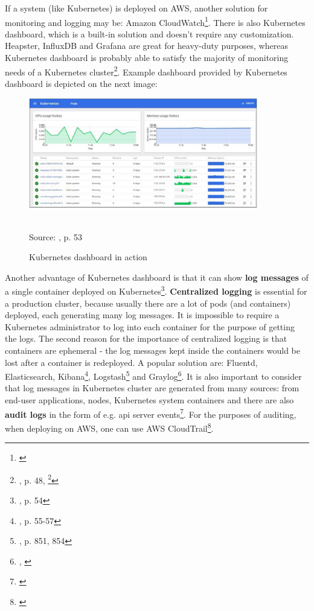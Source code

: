 If a system (like Kubernetes) is deployed on AWS, another solution for monitoring and logging may be: Amazon CloudWatch\footnote{\cite{online-cw}}. There is also Kubernetes dashboard, which is a built-in solution and doesn't require any customization. Heapster, InfluxDB and Grafana are great for heavy-duty purposes, whereas Kubernetes dashboard is probably able to satisfy the majority of monitoring needs of a Kubernetes cluster\footnote{\cite{book-mastering-k8s}, p. 48, \footnote{\cite{book-devops-k8s}, p. 875, 879-882}}. Example dashboard provided by Kubernetes dashboard is depicted on the next image:
\begin{figure}[H]
  \centering
  \includegraphics[width=10cm]{figures/k8s-dashboard.png}
  \label{fig:grafana}
  \caption{Kubernetes dashboard in action}
  \\
  \tiny{Source: \cite{book-mastering-k8s}, p. 53}
\end{figure}

Another advantage of Kubernetes dashboard is that it can show \textbf{log messages} of a single container deployed on Kubernetes\footnote{\cite{book-mastering-k8s}, p. 54}. \textbf{Centralized logging} is essential for a production cluster, because usually there are a lot of pods (and containers) deployed, each generating many log messages. It is impossible to require a Kubernetes administrator to log into each container for the purpose of getting the logs. The second reason for the importance of centralized logging is that containers are ephemeral - the log messages kept inside the containers would be lost after a container is redeployed. A popular solution are: Fluentd, Elasticsearch, Kibana\footnote{\cite{book-mastering-k8s}, p. 55-57}, Logstash\footnote{\cite{book-devops-k8s}, p. 851, 854} and Graylog\footnote{\cite{online-prod-year-k8s}, \cite{online-graylog}}. It is also important to consider that log messages in Kubernetes cluster are generated from many sources: from end-user applications, nodes, Kubernetes system containers and there are also \textbf{audit logs} in the form of e.g. api server events\footnote{\cite{online-graylog-art}}. For the purposes of auditing, when deploying on AWS, one can use AWS CloudTrail\footnote{\cite{online-ct}}.

